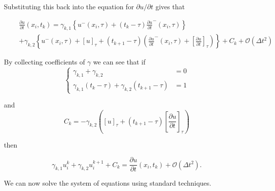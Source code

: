 Substituting this back into the equation for $\partial u / \partial t$ gives that 

\begin{align}
    \phantom{\quad} & \frac{\partial u}{\partial t}(x_i,t_k) = \gamma_{k,1}\left\{u^-(x_i,\tau) + (t_k - \tau)\frac{\partial u}{\partial t}^-(x_i,\tau)\right\} \\
    & + \gamma_{k,2} \left\{u^-(x_i,\tau) + [u]_\tau + (t_{k+1} - \tau) \left( \frac{\partial u}{\partial t}^-(x_i,\tau) + \left[\frac{\partial u}{\partial t} \right]_\tau \right) \right\} + C_k + \mathcal{O}(\Delta t^2)
\end{align}

By collecting coefficients of $\gamma$ we can see that if
\begin{equation}
    \left\{ \begin{aligned}
        \gamma_{k,1} + \gamma_{k,2} & = 0 \\
        \gamma_{k,1}(t_k - \tau) + \gamma_{k,2}(t_{k+1} - \tau) & = 1
    \end{aligned} \right.
\end{equation}

and
\begin{equation}
    C_k = -\gamma_{k,2}\left([u]_\tau + (t_{k+1} - \tau)\left[\frac{\partial u}{\partial t}\right]_\tau \right)
\end{equation}

then

\begin{equation}
    \gamma_{k,1} u_i^k + \gamma_{k,2} u_i^{k+1} + C_k = \frac{\partial u}{\partial t}(x_i,t_k) + \mathcal{O}(\Delta t^2) .
\end{equation}

We can now solve the system of equations using standard techniques.

